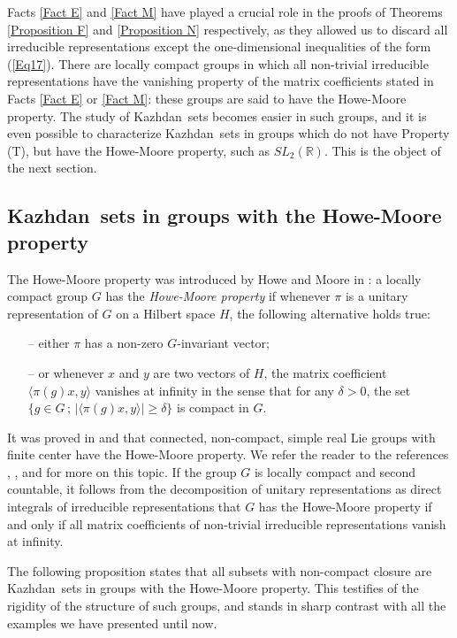 \documentclass[11pt,english,a4paper]{smfart}
\numberwithin{equation}{section}
\theoremstyle{definition}
\begin{document}
Facts \ref{Fact E} and \ref{Fact M} have played a crucial role in the proofs of Theorems \ref{Proposition F} and \ref{Proposition N} respectively, as they allowed us to discard all irreducible representations except the one-dimensional  inequalities of the form (\ref{Eq17}). There are locally compact groups in which all non-trivial irreducible representations have the vanishing property of the matrix coefficients stated in Facts \ref{Fact E} or \ref{Fact M}: these groups are said to have the Howe-Moore property. The study of {Kazhdan}\ sets becomes easier in such groups, and it is even possible to characterize {Kazhdan}\ sets in groups which do not have Property (T), but have the Howe-Moore property, such as $SL_{2}({\ensuremath{\mathbb R}})$. This is the object of the next section.

\subsection{{Kazhdan}\ sets in groups with the Howe-Moore property}\label{Subsection 8.3}
The Howe-Moore property was introduced by Howe and Moore in \cite{HM}: a locally compact group $G$ has the \emph{Howe-Moore property} if whenever $\pi $ is a unitary representation of $G$ on a Hilbert space $H$, the following alternative holds true:
\begin{enumerate}
 \item [--] either $\pi $ has a non-zero $G$-invariant vector;
\item[--] or whenever $x$ and $y$ are two vectors of $H$, the matrix coefficient ${\ensuremath{{\langle {\pi (g)x},{y}\rangle}}}$ vanishes at infinity in the sense that for any $\delta >0$, the set 
$\{g\in G\,;\,
\bigl|{\ensuremath{{\langle {\pi (g)x},{y}\rangle}}}\bigr|\ge \delta \}$ is compact in $G$.
\end{enumerate}
It was proved in \cite{HM} and \cite{Z} that connected, non-compact, simple real Lie groups with finite center have the Howe-Moore property. We refer the reader to the references \cite{BM}, \cite{C}, and \cite{CdHC} for more on this topic. If the group $G$ is locally compact and second countable, it follows from the decomposition of unitary representations as direct integrals of irreducible representations that $G$ has the Howe-Moore property if and only if all matrix coefficients of non-trivial irreducible representations vanish at infinity.
\par\smallskip
The following proposition states that all subsets with non-compact closure are {Kazhdan}\ sets in groups with the Howe-Moore property. This testifies of the rigidity of the structure of such groups, and stands in sharp contrast with all the examples we have presented until now.
\end{document}
